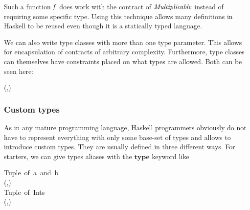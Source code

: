 \documentclass[paper=A4,twoside=true,openright,parskip=full,chapterprefix=true,headings=normal,bibliography=totoc,listof=totoc,titlepage=on,captions=tableabove,draft=false,british]{scrreprt}%
\begin{document}
Such a function \ensuremath{\Varid{f}} does work with the contract of \ensuremath{\Conid{Multiplicable}}
instead of requiring some specific type. Using this technique allows
many definitions in Haskell to be reused even though it is a statically
typed language.

We can also write type classes with more than one type parameter. This
allows for encapsulation of contracts of arbitrary complexity.
Furthermore, type classes can themselves have constraints placed on what
types are allowed. Both can be seen here:


\begin{hscode}\SaveRestoreHook
{}%
%
%
%
\>[B]{}\;(\;,\;)\Rightarrow {}\;\;\;\;\<[E]%
\\
\>[B]{}\<[5]%
\>[5]{}\<[5E]%
\ColumnHook
\end{hscode}\resethooks
\vspace{-2\baselineskip}

\hypertarget{custom-types}{%
\subsubsection{Custom types}\label{custom-types}}

As in any mature programming language, Haskell programmers obviously do
not have to represent everything with only some base-set of types and
allows to introduce custom types. They are usually defined in three
different ways. For starters, we can give types aliases with the \ensuremath{\mathbf{type}}
keyword like


\begin{hscode}\SaveRestoreHook
{}%
%
\>[B]{}\mbox{\onelinecomment  Tuple of a and b}{}\<[E]%
\\
\>[B]{}\;\;\;\mathrel{=}(,){}\<[E]%
\\[\blanklineskip]%
\>[B]{}\mbox{\onelinecomment  Tuple of Ints}{}\<[E]%
\\
\>[B]{}\;\mathrel{=}(,){}\<[E]%
\ColumnHook
\end{hscode}\resethooks
\vspace{-2\baselineskip}
\end{document}
